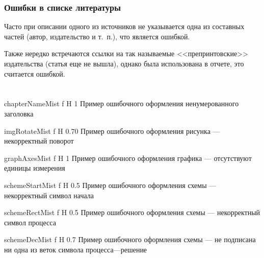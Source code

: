 \begin{appendices}
	\subsection{Ошибки в списке литературы}
	Часто при описании одного из источников не указывается одна из составных частей (автор, издательство и т.~п.), что является ошибкой.
	
	Также нередко встречаются ссылки на так называемые <<препринтовские>> издательства (статья еще не вышла), однако была использована в отчете, это считается ошибкой.
	
	\chapter{}
	{chapterNameMist} %
	{f} %
	{H} %
	{1\textwidth} %
	{Пример ошибочного оформления ненумерованного заголовка} %
	
	{imgRotateMist} %
	{f} %
	{H} %
	{0.70\textwidth} %
	{Пример ошибочного оформления рисунка --- некорректный поворот} %
	
	{graphAxesMist} %
	{f} %
	{H} %
	{1\textwidth} %
	{Пример ошибочного оформления графика --- отсутствуют единицы измерения} %
	
	{schemeStartMist} %
	{f} %
	{H} %
	{0.5\textwidth} %
	{Пример ошибочного оформления схемы --- некорректный символ начала} %
	
	{schemeRectMist} %
	{f} %
	{H} %
	{0.5\textwidth} %
	{Пример ошибочного оформления схемы --- некорректный символ процесса} %
	
	{schemeDecMist} %
	{f} %
	{H} %
	{0.7\textwidth} %
	{Пример ошибочного оформления схемы --- не подписана ни одна из веток символа процесса---решение} %
	

\end{appendices}
